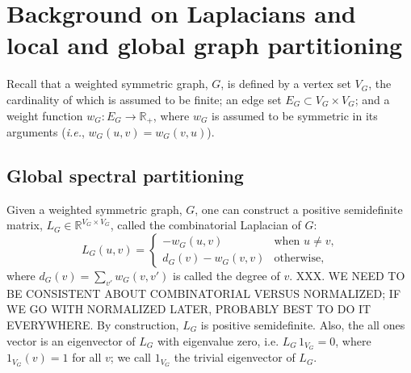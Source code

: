 \documentclass[12pt]{article}
\newcommand{\reals}{\mathbb{R}}
\theoremstyle{plain}
\begin{document}
\section{Background on Laplacians and local and global graph partitioning}
\label{S:introduction}

Recall that a weighted symmetric graph, $G$, is defined by a vertex set 
$V_G$, the cardinality of which 
is assumed to be finite; 
an edge set $E_G \subset V_G \times V_G$; 
and a weight function $w_G : E_G \to \reals_+$, where $w_G$ is assumed to 
be symmetric in its arguments (\emph{i.e.}, $w_G(u,v) = w_G(v,u)$).  


\subsection{Global spectral partitioning}

Given a weighted symmetric graph, $G$, one can construct a positive
semidefinite matrix, $L_G \in \reals^{V_G \times V_G}$, called the 
combinatorial Laplacian of $G$:
\[
  L_G(u,v)
  =
  \begin{cases}
    - w_G(u,v) & \text{when $u \neq v$,} \\
    d_G(v) - w_G(v,v) & \text{otherwise,}
  \end{cases}
\]
where $d_G(v) = \sum_{v'} w_G(v,v')$ is called the degree of $v$.
XXX.  WE NEED TO BE CONSISTENT ABOUT COMBINATORIAL VERSUS NORMALIZED; IF WE GO WITH NORMALIZED LATER, PROBABLY BEST TO DO IT EVERYWHERE.
By construction, $L_G$ is positive semidefinite.  
Also, the all ones
vector is an eigenvector of $L_G$ with eigenvalue zero, i.e. $L_G \, 1_{V_G}
= 0$, where $1_{V_G}(v) = 1$ for all $v$; we call $1_{V_G}$ the
trivial eigenvector of $L_G$.  
\end{document}
